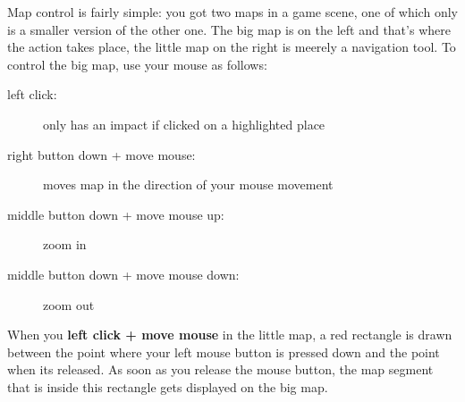 Map control is fairly simple: you got two maps in a game scene, one of which only is a smaller version of the other one. The big map is on the left and that's where the action takes place, the little map on the right is meerely a navigation tool. To control the big map, use your mouse as follows:

  \begin{description}
    \item[left click:] only has an impact if clicked on a highlighted place
    \item[right button down + move mouse:] moves map in the direction of your mouse movement
    \item[middle button down + move mouse up:] zoom in
    \item[middle button down + move mouse down:] zoom out
  \end{description}

  When you \textbf{left click + move mouse} in the little map, a red rectangle is drawn between the point where your left mouse button is pressed down and the point when its released. As soon as you release the mouse button, the map segment that is inside this rectangle gets displayed on the big map.
